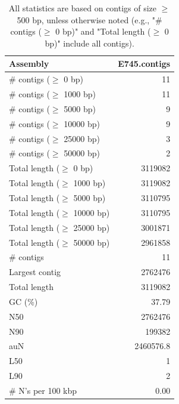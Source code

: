 \documentclass[12pt,a4paper]{article}
\begin{document}
\begin{table}[ht]
\begin{center}
\caption{All statistics are based on contigs of size $\geq$ 500 bp, unless otherwise noted (e.g., "\# contigs ($\geq$ 0 bp)" and "Total length ($\geq$ 0 bp)" include all contigs).}
\begin{tabular}{|l*{1}{|r}|}
\hline
Assembly & E745.contigs \\ \hline
\# contigs ($\geq$ 0 bp) & 11 \\ \hline
\# contigs ($\geq$ 1000 bp) & 11 \\ \hline
\# contigs ($\geq$ 5000 bp) & 9 \\ \hline
\# contigs ($\geq$ 10000 bp) & 9 \\ \hline
\# contigs ($\geq$ 25000 bp) & 3 \\ \hline
\# contigs ($\geq$ 50000 bp) & 2 \\ \hline
Total length ($\geq$ 0 bp) & 3119082 \\ \hline
Total length ($\geq$ 1000 bp) & 3119082 \\ \hline
Total length ($\geq$ 5000 bp) & 3110795 \\ \hline
Total length ($\geq$ 10000 bp) & 3110795 \\ \hline
Total length ($\geq$ 25000 bp) & 3001871 \\ \hline
Total length ($\geq$ 50000 bp) & 2961858 \\ \hline
\# contigs & 11 \\ \hline
Largest contig & 2762476 \\ \hline
Total length & 3119082 \\ \hline
GC (\%) & 37.79 \\ \hline
N50 & 2762476 \\ \hline
N90 & 199382 \\ \hline
auN & 2460576.8 \\ \hline
L50 & 1 \\ \hline
L90 & 2 \\ \hline
\# N's per 100 kbp & 0.00 \\ \hline
\end{tabular}
\end{center}
\end{table}
\end{document}
